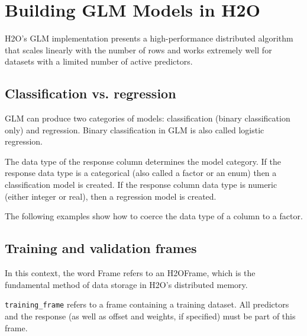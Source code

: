 \waterExampleInR


\waterExampleInPython



\section{Building GLM Models in H2O}

H2O's GLM implementation presents a high-performance distributed algorithm that scales linearly with the number
of rows and works extremely well for datasets with a limited number of active predictors.

\subsection{Classification vs. regression}

GLM can produce two categories of models: classification (binary classification only) and regression.  Binary
classification in GLM is also called logistic regression.

The data type of the response column determines the model category.  If the response data type is a categorical
(also called a factor or an enum) then a classification model is created.  If the response column data type is
numeric (either integer or real), then a regression model is created.

The following examples show how to coerce the data type of a column to a factor.

\bigskip
\waterExampleInR


\waterExampleInPython


\subsection{Training and validation frames}

In this context, the word Frame refers to an H2OFrame, which is the fundamental method of data storage in H2O's distributed memory.

\texttt{training\_frame} refers to a frame containing a training dataset.  All predictors and the response (as
well as offset and weights, if specified) must be part of this frame.


